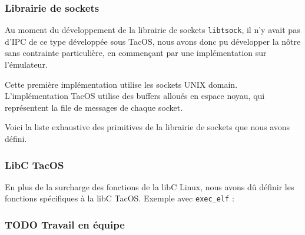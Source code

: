 \subsubsection{Librairie de sockets}

Au moment du développement de la librairie de sockets \verb|libtsock|, il n'y avait pas d'IPC de ce type développée sous TacOS, nous avons donc pu développer la nôtre sans contrainte particulière, en commençant par une implémentation sur l'émulateur.

Cette première implémentation utilise les sockets UNIX domain. L'implémentation TacOS utilise des buffers alloués en espace noyau, qui représentent la file de messages de chaque socket.

Voici la liste exhaustive des primitives de la librairie de sockets que nous avons défini.



\subsubsection{LibC TacOS}

En plus de la surcharge des fonctions de la libC Linux, nous avons dû définir les fonctions spécifiques à la libC TacOS. Exemple avec \verb|exec_elf| :


\subsubsection{TODO Travail en équipe}
